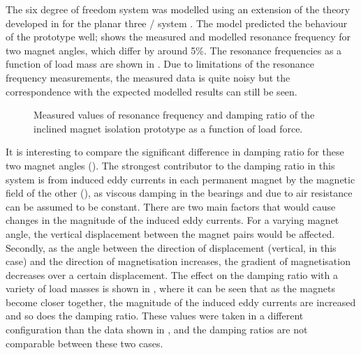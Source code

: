 \documentclass[11pt,a4paper]{memoir}
\begin{document}
The six degree of freedom system was modelled using an extension of the theory developed in  for the planar three \dof/ system \parencite{frizenschaf2011-honoursthesis}.
The model predicted the behaviour of the prototype well;  shows the measured and modelled resonance frequency for two magnet angles, which differ by around 5\%.
The resonance frequencies as a function of load mass are shown in .
Due to limitations of the resonance frequency measurements, the measured data is quite noisy but the correspondence with the expected modelled results can still be seen.

\begin{figure}
\begin{wide}
%
\hfil
{}
\end{wide}
\caption{Measured values of resonance frequency and damping ratio of the inclined magnet isolation prototype as a function of load force.}
\end{figure}

It is interesting to compare the significant difference in damping ratio for these two magnet angles ().
The strongest contributor to the damping ratio in this system is from induced eddy currents in each permanent magnet by the magnetic field of the other (), as viscous damping in the bearings and due to air resistance can be assumed to be constant.
There are two main factors that would cause changes in the magnitude of the induced eddy currents.
For a varying magnet angle, the vertical displacement between the magnet pairs would be affected.
Secondly, as the angle between the direction of displacement (vertical, in this case) and the direction of magnetisation increases, the gradient of magnetisation decreases over a certain displacement.
The effect on the damping ratio with a variety of load masses is shown in , where it can be seen that as the magnets become closer together, the magnitude of the induced eddy currents are increased and so does the damping ratio.
These values were taken in a different configuration than the data shown in , and the damping ratios are not comparable between these two cases.
\end{document}
